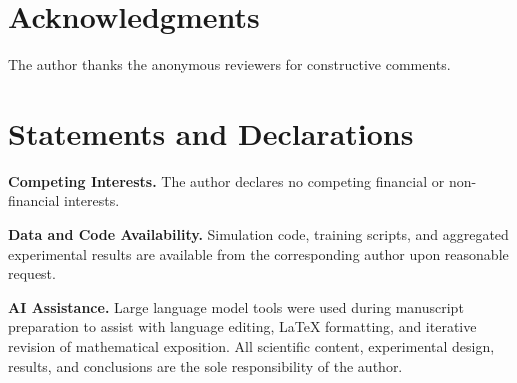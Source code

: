 \documentclass[11pt,a4paper]{article}
\theoremstyle{plain}
\theoremstyle{definition}
\begin{document}
\section*{Acknowledgments}
The author thanks the anonymous reviewers for constructive comments.

\section*{Statements and Declarations}

\textbf{Competing Interests.}
The author declares no competing financial or non-financial interests.

\textbf{Data and Code Availability.}
Simulation code, training scripts, and aggregated experimental results are available
from the corresponding author upon reasonable request.

\textbf{AI Assistance.}
Large language model tools were used during manuscript preparation to assist with
language editing, \LaTeX{} formatting, and iterative revision of mathematical
exposition.  All scientific content, experimental design, results, and conclusions are
the sole responsibility of the author.



\end{document}
